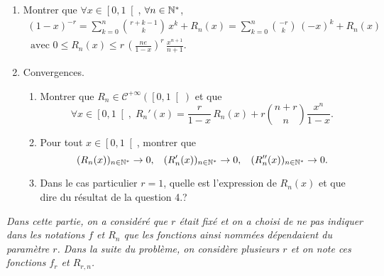 \begin{enumerate}
  \item Montrer que $\forall x \in \left[0,1\right[$, $\forall n \in \mathbb{N}^*$,
\begin{multline*}
  (1-x)^{-r} = \sum_{k=0}^{n}\binom{r + k -1}{k}\,x^k + R_n(x) 
   = \sum_{k=0}^{n}\binom{-r}{k}\,(-x)^k + R_n(x) \\
   \text{ avec }
   0 \leq R_n(x) \leq r\,\left( \frac{ne}{1-x} \right)^r \,\frac{x^{n+1}}{n+1} .
\end{multline*}

  \item Convergences.
  \begin{enumerate}
    \item Montrer que $R_n \in \mathcal{C}^{+\infty}(\left[0, 1 \right[)$ et que
\[
  \forall x \in \left[0, 1 \right[, \; R_n'(x) = \frac{r}{1-x}\,R_n(x) + r\binom{n+r}{n}\frac{x^n}{1-x}.
\]
    \item Pour tout $x \in \left[0, 1 \right[$, montrer que
\[
(R_n(x))_{n \in \mathbb{N}^*}\rightarrow 0,\hspace{0.3cm} (R'_n(x))_{n \in \mathbb{N}^*}\rightarrow 0, \hspace{0.3cm} (R''_n(x))_{n \in \mathbb{N}^*} \rightarrow 0. 
\]
    \item Dans le cas particulier $r=1$, quelle est l'expression de $R_n(x)$ et que dire du résultat de la question 4.?
  \end{enumerate}
\end{enumerate}\noindent
\textit{
Dans cette partie, on a considéré que $r$ était fixé et on a choisi de ne pas indiquer dans les notations $f$ et $R_n$ que les fonctions ainsi nommées dépendaient du paramètre $r$. Dans la suite du problème, on considère plusieurs $r$ et on note ces fonctions $f_r$ et $R_{r,n}$.    
}

